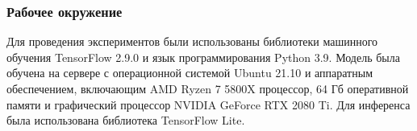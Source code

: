 \subsubsection{Рабочее окружение}\label{sect-2-2-1}

Для проведения экспериментов были использованы библиотеки машинного обучения TensorFlow 2.9.0 и язык программирования Python 3.9. Модель была обучена на сервере с операционной системой Ubuntu 21.10 и аппаратным обеспечением, включающим AMD Ryzen 7 5800X процессор, 64 Гб оперативной памяти и графический процессор NVIDIA GeForce RTX 2080 Ti. Для инференса была использована библиотека TensorFlow Lite.
